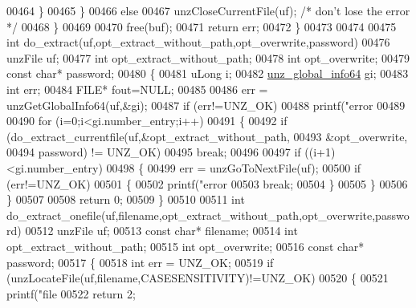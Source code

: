 \begin{DoxyCode}
{{{{{{{{{{{{{{{{{00464             \}
00465         \}
00466         \textcolor{keywordflow}{else}
00467             unzCloseCurrentFile(uf); \textcolor{comment}{/* don't lose the error */}
00468     \}
00469 
00470     free(buf);
00471     \textcolor{keywordflow}{return} err;
00472 \}
00473 
00474 
00475 \textcolor{keywordtype}{int} do\_extract(uf,opt\_extract\_without\_path,opt\_overwrite,password)
00476     unzFile uf;
00477     \textcolor{keywordtype}{int} opt\_extract\_without\_path;
00478     \textcolor{keywordtype}{int} opt\_overwrite;
00479     \textcolor{keyword}{const} \textcolor{keywordtype}{char}* password;
00480 \{
00481     uLong i;
00482     \hyperlink{structunz__global__info64__s}{unz\_global\_info64} gi;
00483     \textcolor{keywordtype}{int} err;
00484     FILE* fout=NULL;
00485 
00486     err = unzGetGlobalInfo64(uf,&gi);
00487     \textcolor{keywordflow}{if} (err!=UNZ\_OK)
00488         printf(\textcolor{stringliteral}{"error %
00489 
00490     \textcolor{keywordflow}{for} (i=0;i<gi.number\_entry;i++)
00491     \{
00492         \textcolor{keywordflow}{if} (do\_extract\_currentfile(uf,&opt\_extract\_without\_path,
00493                                       &opt\_overwrite,
00494                                       password) != UNZ\_OK)
00495             \textcolor{keywordflow}{break};
00496 
00497         \textcolor{keywordflow}{if} ((i+1)<gi.number\_entry)
00498         \{
00499             err = unzGoToNextFile(uf);
00500             \textcolor{keywordflow}{if} (err!=UNZ\_OK)
00501             \{
00502                 printf(\textcolor{stringliteral}{"error %
00503                 \textcolor{keywordflow}{break};
00504             \}
00505         \}
00506     \}
00507 
00508     \textcolor{keywordflow}{return} 0;
00509 \}
00510 
00511 \textcolor{keywordtype}{int} do\_extract\_onefile(uf,filename,opt\_extract\_without\_path,opt\_overwrite,password)
00512     unzFile uf;
00513     \textcolor{keyword}{const} \textcolor{keywordtype}{char}* filename;
00514     \textcolor{keywordtype}{int} opt\_extract\_without\_path;
00515     \textcolor{keywordtype}{int} opt\_overwrite;
00516     \textcolor{keyword}{const} \textcolor{keywordtype}{char}* password;
00517 \{
00518     \textcolor{keywordtype}{int} err = UNZ\_OK;
00519     \textcolor{keywordflow}{if} (unzLocateFile(uf,filename,CASESENSITIVITY)!=UNZ\_OK)
00520     \{
00521         printf(\textcolor{stringliteral}{"file %
00522         \textcolor{keywordflow}{return} 2;
}}}}}}}}}}}}}}}}}}}}
\end{DoxyCode}
